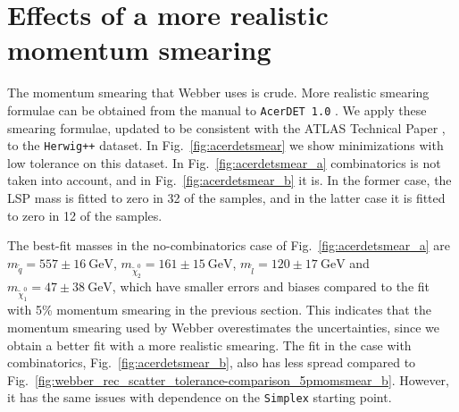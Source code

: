 \documentclass[twoside,english]{uiofysmaster}
\begin{document}
\section{Effects of a more realistic momentum smearing}
\label{sec:acerdet_smearing}
The momentum smearing that Webber uses is crude. More realistic smearing formulae can be obtained from the manual to {\tt AcerDET 1.0} \cite{RichterWas:2002ch}. We apply these smearing formulae, updated to be consistent with the ATLAS Technical Paper \cite{Aad:2008zzm}, to the {\tt Herwig++} dataset. In Fig.\ \ref{fig:acerdetsmear} we show minimizations with low tolerance on this dataset. In Fig.\ \ref{fig:acerdetsmear_a} combinatorics is not taken into account, and in Fig.\ \ref{fig:acerdetsmear_b} it is. In the former case, the LSP mass is fitted to zero in 32 of the samples, and in the latter case it is fitted to zero in 12 of the samples. 

The best-fit masses in the no-combinatorics case of Fig.\ \ref{fig:acerdetsmear_a} are $m_{\tilde q} = 557\pm 16~\mathrm{GeV}$, $m_{\tilde\chi_2^0} = 161 \pm 15~\mathrm{GeV}$, $m_{\tilde l} = 120 \pm 17~\mathrm{GeV}$ and $m_{\tilde\chi_1^0} = 47 \pm 38~\mathrm{GeV}$, which have smaller errors and biases compared to the fit with 5\% momentum smearing in the previous section. This indicates that the momentum smearing used by Webber overestimates the uncertainties, since we obtain a better fit with a more realistic smearing. The fit in the case with combinatorics, Fig.\ \ref{fig:acerdetsmear_b}, also has less spread compared to Fig.\ \ref{fig:webber_rec_scatter_tolerance-comparison_5pmomsmear_b}. However, it has the same issues with dependence on the {\tt Simplex} starting point.
\end{document}
